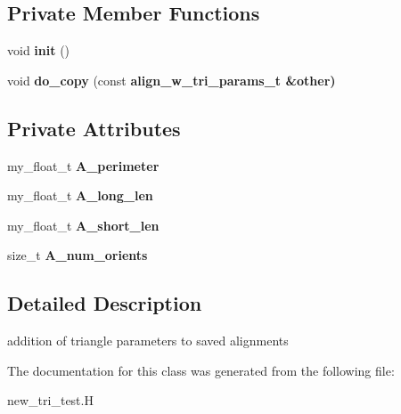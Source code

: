 \subsection*{Private Member Functions}
\begin{CompactItemize}
\item 
void \textbf{init} ()\label{classASCbase_1_1align__w__tri__params__t_21f99cdf72bd080020c80bb787238850}

\item 
void \textbf{do\_\-copy} (const \bf{align\_\-w\_\-tri\_\-params\_\-t} \&other)\label{classASCbase_1_1align__w__tri__params__t_d13773949adc8a04a545163e0c0bd70b}

\end{CompactItemize}
\subsection*{Private Attributes}
\begin{CompactItemize}
\item 
my\_\-float\_\-t \textbf{A\_\-perimeter}\label{classASCbase_1_1align__w__tri__params__t_809692e4cdff137a10bcc0a6d3435f22}

\item 
my\_\-float\_\-t \textbf{A\_\-long\_\-len}\label{classASCbase_1_1align__w__tri__params__t_d8d0c543b711b70da6acbdfa4b5d2250}

\item 
my\_\-float\_\-t \textbf{A\_\-short\_\-len}\label{classASCbase_1_1align__w__tri__params__t_1fd1f4c5f12a0e9f777dd1eab5addde2}

\item 
size\_\-t \textbf{A\_\-num\_\-orients}\label{classASCbase_1_1align__w__tri__params__t_b97ddf7a0ca9396114e63dc72d72dfe2}

\end{CompactItemize}


\subsection{Detailed Description}
addition of triangle parameters to saved alignments 



The documentation for this class was generated from the following file:\begin{CompactItemize}
\item 
new\_\-tri\_\-test.H\end{CompactItemize}
